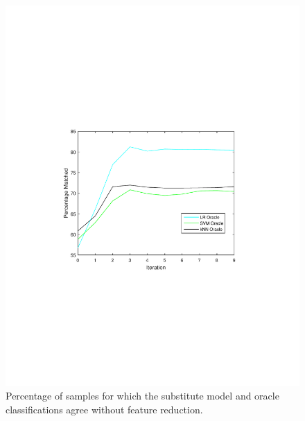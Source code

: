 \begin{figure}
	\centering
	\begin{minipage}{0.42\linewidth}
		\centering
		\includegraphics[width =\linewidth, trim = 110 240 120 255, clip]{figs/final_fig_1.pdf}
		\caption{Percentage of samples for which the substitute model and oracle classifications agree without feature reduction.}
		\label{fig:sub_approx}
	\end{minipage}
	\qquad
	\begin{minipage}{0.42\linewidth}
		\centering

\end{minipage}
\end{figure}
